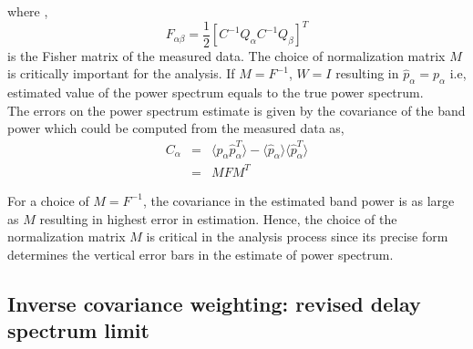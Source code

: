 \documentclass[twocolumn]{emulateapj}
\begin{document}
where , 
\begin{equation}
 F_{\alpha\beta} = \frac {1} { 2} [C^{-1}Q_{\alpha}C^{-1}Q_{\beta}]^{T}
 \label{eq20}
\end{equation} 
 is the Fisher matrix of the measured data. The choice of normalization matrix $M$ is critically important for the analysis. If $M = F^{-1}$, $W=I$ resulting in $\hat p_{\alpha} = p_{\alpha}$ i.e, estimated value of the power spectrum equals to the true power spectrum.\\
 The errors on the power spectrum estimate is given by the covariance of the band power which could be computed from the measured data as,  
\begin{eqnarray}
 C_{\alpha} & = & \langle \hat p_{\alpha} \hat p_{\alpha}^{T} \rangle - \langle \hat p_{\alpha} \rangle \langle \hat p_{\alpha}^{T} \rangle \nonumber\\
 		& = & MFM^{T}
\label{eq21}
 \end{eqnarray} 
 
 For a choice of $M = F^{-1}$, the covariance in the estimated band power is as large as $M$ resulting in highest error in estimation. Hence, the choice of the normalization matrix $M$ is critical in the analysis process since its precise form determines the vertical error bars in the estimate of power spectrum. 

\subsection{Inverse covariance weighting: revised delay spectrum limit}
\end{document}

